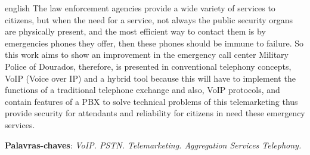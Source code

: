\begin{resumo}[Abstract]
 \begin{otherlanguage*}{english}
   The law enforcement agencies provide a wide variety of services to citizens, but when the need for a service, not always the public security organs are physically present, and the most efficient way to contact them is by emergencies phones they offer, then these phones should be immune to failure. So this work aims to show an improvement in the emergency call center Military Police of Dourados, therefore, is presented in conventional telephony concepts, VoIP (Voice over IP) and a hybrid tool because this will have to implement the functions of a traditional telephone exchange and also, VoIP protocols, and contain features of a PBX to solve technical problems of this telemarketing thus provide security for attendants and reliability for citizens in need these emergency services.

   \vspace{\onelineskip}
 
   \noindent 
   \textbf{Palavras-chaves}: \textit{VoIP. PSTN. Telemarketing. Aggregation Services Telephony.}
 \end{otherlanguage*}
\end{resumo}